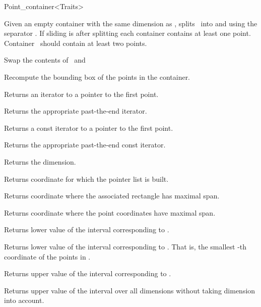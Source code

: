 \begin{ccRefClass}{Point_container<Traits>}
\begin{ccAdvanced}
{Given an empty container  with the same dimension as \ccVar, splits \ccVar\ into
\ccVar and  using the separator . If sliding is  after splitting 
each container contains at least one point. Container \ccVar\ should contain at least two points.}


{Swap the contents of \ccVar\ and }


{Recompute the bounding box of the points in the container.}


{
Returns an iterator to a pointer to the first point.
}

{
Returns the appropriate past-the-end iterator.
}

{
Returns a const iterator to a pointer to the first point.
}

{
Returns the appropriate past-the-end const iterator.
}

{
Returns the dimension.
}

{
Returns coordinate for which the pointer list is built.
}

{
Returns coordinate where the associated rectangle has maximal span.
}

{
Returns coordinate where the point coordinates have maximal span.
}

{
Returns lower value of the interval corresponding to
.
}


{
Returns lower value of the interval corresponding to
. That is, the smallest
-th coordinate of the points in
\ccVar.
}


{
Returns upper value of the interval corresponding to
.
}

{
Returns upper value of the interval over all dimensions
without taking dimension  into account.
}


\end{ccAdvanced}
\end{ccRefClass}
